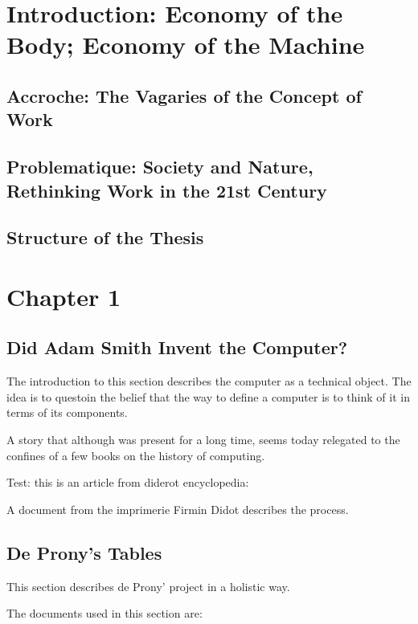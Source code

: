 \documentclass[version=last,draft=true,paper=A4,portrait,twoside=true,twocolumn=true,headinclude=false,footinclude=false,fontsize=10,BCOR=20mm,DIV=13,pagesize=auto,titlepage=false,mpinclude=false,open=right,chapterprefix=true,numbers=autoendperiod,headsepline=false,parskip=false]{scrbook}
\author{Carlos Alberto Rivera Carreño}
\date{}
\title{}
\begin{document}
\nocite{*}
\chapter{Introduction: Economy of the Body; Economy of the Machine}
\label{sec:orgb850f14}
\printbibliography[heading=none,keyword=introduction]
\section{Accroche: The Vagaries of the Concept of Work}
\label{sec:org42e9ac6}
\printbibliography[heading=none,keyword=introduction-1]
\section{Problematique: Society and Nature, Rethinking Work in the 21st Century}
\label{sec:org426f684}
\printbibliography[heading=none,keyword=introduction-2]
\section{Structure of the Thesis}
\label{sec:org7179436}
\chapter{Chapter 1}
\label{sec:org76c1ee6}
\section{Did Adam Smith Invent the Computer?}
\label{sec:org5055576}
The introduction to this section describes the computer as a technical
object. The idea is to questoin the belief that the way to define a
computer is to think of it in terms of its components. 

A story that although was present for a long time, seems today relegated to
the confines of a few books on the history of computing. 

Test: this is an article from diderot encyclopedia:

A document from the imprimerie Firmin Didot describes the process.

\printbibliography[heading=none,keyword=chapter-1]
\section{De Prony's Tables}
\label{sec:orge09dc5d}
This section describes de Prony' project in a holistic way. 

The documents used in this section are:
\end{document}
